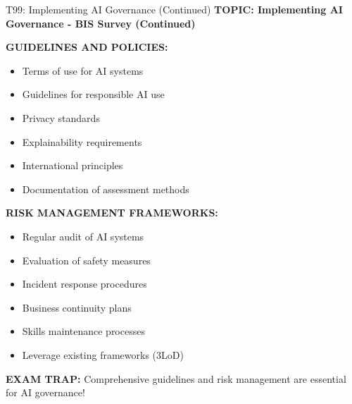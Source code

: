 \documentclass[8pt]{beamer}
\begin{document}
	\begin{frame}{T99: Implementing AI Governance (Continued)}
		\fontsize{6.5}{7.5}\selectfont
		\textbf{TOPIC: Implementing AI Governance - BIS Survey (Continued)}
		
		\vspace{0.1cm}
		\textbf{GUIDELINES AND POLICIES:}
		\begin{itemize}
			\item Terms of use for AI systems
			\item Guidelines for responsible AI use
			\item Privacy standards
			\item Explainability requirements
			\item International principles
			\item Documentation of assessment methods
		\end{itemize}
		
		\vspace{0.1cm}
		\textbf{RISK MANAGEMENT FRAMEWORKS:}
		\begin{itemize}
			\item Regular audit of AI systems
			\item Evaluation of safety measures
			\item Incident response procedures
			\item Business continuity plans
			\item Skills maintenance processes
			\item Leverage existing frameworks (3LoD)
		\end{itemize}
		
		\textcolor{myred}{\textbf{EXAM TRAP:}} Comprehensive guidelines and risk management are \textcolor{myblue}{essential for AI governance}!
	\end{frame}
	
\end{document}
